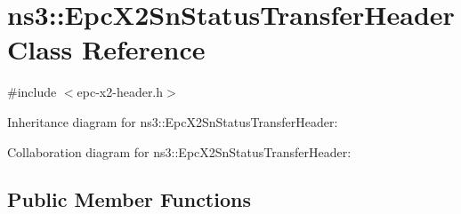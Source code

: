 \hypertarget{classns3_1_1EpcX2SnStatusTransferHeader}{}\section{ns3\+:\+:Epc\+X2\+Sn\+Status\+Transfer\+Header Class Reference}
\label{classns3_1_1EpcX2SnStatusTransferHeader}


{\ttfamily \#include $<$epc-\/x2-\/header.\+h$>$}



Inheritance diagram for ns3\+:\+:Epc\+X2\+Sn\+Status\+Transfer\+Header\+:


Collaboration diagram for ns3\+:\+:Epc\+X2\+Sn\+Status\+Transfer\+Header\+:
\subsection*{Public Member Functions}
